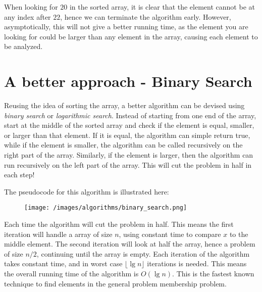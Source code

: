     When looking for $20$ in the sorted array, it is clear that the element cannot be at any index after $22$, hence we can terminate the algorithm early.
    However, asymptotically, this will not give a better running time, as the element you are looking for could be larger than any element in the array, causing each element to be analyzed.

    \section{A better approach - Binary Search}

        Reusing the idea of sorting the array, a better algorithm can be devised using \emph{binary search} or \emph{logarithmic search}.
        Instead of starting from one end of the array, start at the middle of the sorted array and check if the element is equal, smaller, or larger than that element.
        If it is equal, the algorithm can simple return true, while if the element is smaller, the algorithm can be called recursively on the right part of the array.
        Similarly, if the element is larger, then the algorithm can run recursively on the left part of the array.
        This will cut the problem in half in each step!


        The pseudocode for this algorithm is illustrated here:

        \begin{figure}[!h]
            \centering
            \texttt{[image: /images/algorithms/binary\_search.png]}
        \end{figure}

        Each time the algorithm will cut the problem in half.
        This means the first iteration will handle a array of size $n$, using constant time to compare $x$ to the middle element.
        The second iteration will look at half the array, hence a problem of size $n/2$, continuing until the array is empty.
        Each iteration of the algorithm takes constant time, and in worst case $\lfloor\lg n \rfloor$ iterations is needed.
        This means the overall running time of the algorithm is $O(\lg n)$.
        This is the fastest known technique to find elements in the general problem membership problem.


